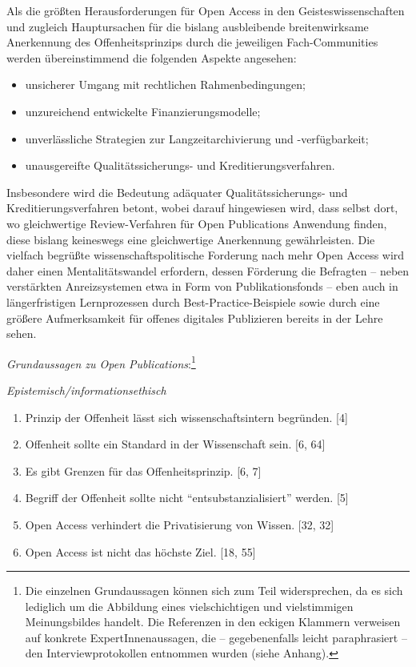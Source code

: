 \documentclass[a4paper,
fontsize=11pt,
oneside,
numbers=noperiodatend,
parskip=half-,
bibliography=totoc,
final
]{scrartcl}
\begin{document}
Als die größten Herausforderungen für Open Access in den
Geisteswissenschaften und zugleich Hauptursachen für die bislang
ausbleibende breitenwirksame Anerkennung des Offenheitsprinzips durch
die jeweiligen Fach-Communities werden übereinstimmend die folgenden
Aspekte angesehen:

\begin{itemize}
\item
  unsicherer Umgang mit rechtlichen Rahmenbedingungen;
\item
  unzureichend entwickelte Finanzierungsmodelle;
\item
  unverlässliche Strategien zur Langzeitarchivierung und -verfügbarkeit;
\item
  unausgereifte Qualitätssicherungs- und Kreditierungsverfahren.
\end{itemize}

Insbesondere wird die Bedeutung adäquater Qualitätssicherungs- und
Kreditierungsverfahren betont, wobei darauf hingewiesen wird, dass
selbst dort, wo gleichwertige Review-Verfahren für Open Publications
Anwendung finden, diese bislang keineswegs eine gleichwertige
Anerkennung gewährleisten. Die vielfach begrüßte wissenschaftspolitische
Forderung nach mehr Open Access wird daher einen Mentalitätswandel
erfordern, dessen Förderung die Befragten -- neben verstärkten
Anreizsystemen etwa in Form von Publikationsfonds -- eben auch in
längerfristigen Lernprozessen durch Best-Practice-Beispiele sowie durch
eine größere Aufmerksamkeit für offenes digitales Publizieren bereits in
der Lehre sehen.

\emph{Grundaussagen zu Open Publications}:\footnote{Die einzelnen
  Grundaussagen können sich zum Teil widersprechen, da es sich lediglich
  um die Abbildung eines vielschichtigen und vielstimmigen
  Meinungsbildes handelt. Die Referenzen in den eckigen Klammern
  verweisen auf konkrete ExpertInnenaussagen, die -- gegebenenfalls
  leicht paraphrasiert -- den Interviewprotokollen entnommen wurden
  (siehe Anhang).}

\emph{Epistemisch/informationsethisch}

\begin{enumerate}
\def\labelenumi{(\arabic{enumi})}
\item
  Prinzip der Offenheit lässt sich wissenschaftsintern begründen. {[}4{]}
\item
  Offenheit sollte ein Standard in der Wissenschaft sein. {[}6, 64{]}
\item
  Es gibt Grenzen für das Offenheitsprinzip. {[}6, 7{]}
\item
  Begriff der Offenheit sollte nicht \enquote{entsubstanzialisiert}
  werden. {[}5{]}
\item
  Open Access verhindert die Privatisierung von Wissen. {[}32, 32{]}
\item
  Open Access ist nicht das höchste Ziel. {[}18, 55{]}
\end{enumerate}
\end{document}
